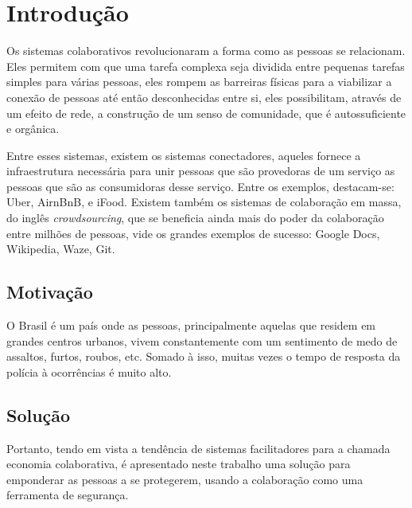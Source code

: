 \chapter{Introdução}
\label{c.introducao}



Os sistemas colaborativos revolucionaram a forma como as pessoas se relacionam. Eles permitem com que uma tarefa complexa seja dividida entre pequenas tarefas simples para várias pessoas, eles rompem as barreiras físicas para a viabilizar a conexão de pessoas até então desconhecidas entre si, eles possibilitam, através de um efeito de rede, a construção de um senso de comunidade, que é autossuficiente e orgânica.

Entre esses sistemas, existem os sistemas conectadores, aqueles fornece a infraestrutura necessária para unir pessoas que são provedoras de um serviço as pessoas que são as consumidoras desse serviço. Entre os exemplos, destacam-se: Uber, AirnBnB, e iFood. Existem também os sistemas de colaboração em massa, do inglês \emph{crowdsourcing}, que se beneficia ainda mais do poder da colaboração entre milhões de pessoas, vide os grandes exemplos de sucesso: Google Docs, Wikipedia, Waze, Git.

\section{Motivação}
\label{s.motivacao}

O Brasil é um país onde as pessoas, principalmente aquelas que residem em grandes centros urbanos, vivem constantemente com um sentimento de medo de assaltos, furtos, roubos, etc. Somado à isso, muitas vezes o tempo de resposta da polícia à ocorrências é muito alto.

\section{Solução}
\label{s.solucao}

Portanto, tendo em vista a tendência de sistemas facilitadores para a chamada economia colaborativa, é apresentado neste trabalho uma solução para emponderar as pessoas a se protegerem, usando a colaboração como uma ferramenta de segurança.

